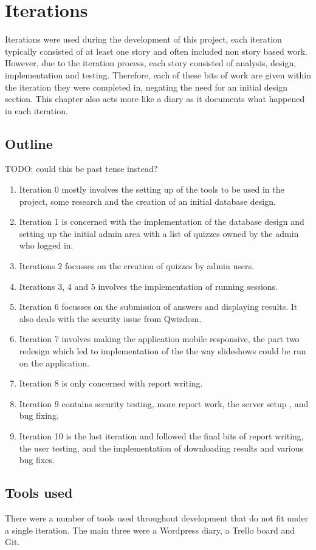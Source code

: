\chapter{Iterations}
Iterations were used during the development of this project, each iteration typically consisted of at least one story and often included non story based work. However, due to the iteration process, each story consisted of analysis, design, implementation and testing. Therefore, each of these bits of work are given within the iteration they were completed in, negating the need for an initial design section. This chapter also acts more like a diary as it documents what happened in each iteration.

\section{Outline}
TODO: could this be past tense instead?
\begin{enumerate}
	\item Iteration 0 mostly involves the setting up of the tools to be used in the project, some research and the creation of an initial database design.
	\item Iteration 1 is concerned with the implementation of the database design and setting up the initial admin area with a list of quizzes owned by the admin who logged in.
	\item Iterations 2 focusses on the creation of quizzes by admin users.
	\item Iterations 3, 4 and 5 involves the implementation of running sessions.
	\item Iteration 6 focusses on the submission of answers and displaying results. It also deals with the security issue from Qwizdom.
	\item Iteration 7 involves making the application mobile responsive, the part two redesign which led to implementation of the the way slideshows could be run on the application.
	\item Iteration 8 is only concerned with report writing.
	\item Iteration 9 contains security testing, more report work, the server setup , and bug fixing.
	\item Iteration 10 is the last iteration and followed the final bits of report writing, the user testing, and the implementation of downloading results and various bug fixes.
\end{enumerate}

\section{Tools used}
There were a number of tools used throughout development that do not fit under a single iteration. The main three were a Wordpress diary, a Trello board and Git. 

